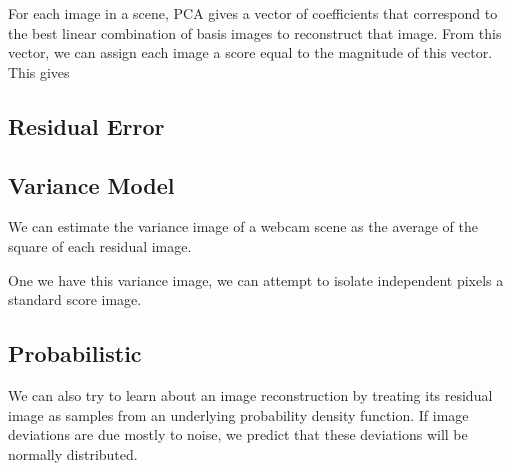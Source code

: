 For each image in a scene, PCA gives a vector of coefficients that correspond to the best linear combination
of basis images to reconstruct that image.  From this vector, we can assign each image a score equal to the
magnitude of this vector.  This gives

\subsection{Residual Error}




\subsection{Variance Model}

We can estimate the variance image of a webcam scene as the average of the square of each residual image.

One we have this variance image, we can attempt to isolate independent pixels a standard score image.


\subsection{Probabilistic}

We can also try to learn about an image reconstruction by treating its residual image as samples from an 
underlying probability density function.  If image deviations are due mostly to noise, we predict that these deviations will be normally distributed.


